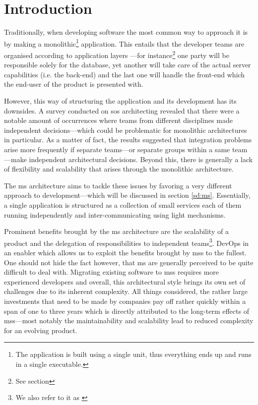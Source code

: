 \section{Introduction}%

Traditionally, when developing software the most common way to
approach it is by making a monolithic\footnote{The application is
built using a single unit, thus everything ends up and runs in a
single executable.} application.
\cite{ms-challenges} This entails that the developer teams are
organised according to application layers
\cite{ms-definition,ms-challenges}---for instance\footnote{See section
} one party will be responsible
solely for the database, yet another will take care of the actual
server capabilities (i.e. the back-end) and the last one will handle
the front-end which the end-user of the product is presented with.

However, this way of structuring the application and its development
has its downsides. A survey conducted on \gls{sos} architecting
\cite{sos-survey} revealed that there were a notable amount of
occurrences where teams from different disciplines made independent
decisions---which could be problematic for monolithic architectures in
particular. As a matter of fact, the results suggested that
integration problems arise more frequently if separate teams---or
separate groups within a same team---make
independent architectural decisions. \cite{sos-survey} Beyond this,
there is generally a lack of flexibility and scalability that arises
through the monolithic architecture. \cite{ms-challenges}

The \gls{ms} architecture aims to tackle these issues
\cite{ms-challenges} by favoring a very different approach to
development---which will be discussed in section \ref{sd:ms}.
Essentially, a single application is structured as a collection of small services
each of them running independently and inter-communicating using light
mechanisms.  \cite{ms-arch-study}

Prominent benefits brought by the \gls{ms} architecture are the
scalability of a product and the delegation of responsibilities to
independent teams\footnote{We also refer to it as
 \cite{ms-definition}}. \cite{ms-migration}
DevOps in an enabler which allows us to exploit
the benefits brought by \glspl{ms} to the fullest.
One should not hide the fact however,
that \gls{ms} are generally perceived to be quite difficult to deal
with. Migrating existing software to \glspl{ms} requires more
experienced developers and overall, this architectural style brings
its own set of challenges due to its inherent complexity.
\cite{ms-pains-gains} All things considered, the rather large
investments that need to be made by companies pay off rather quickly
within a span of one to three years which is directly attributed to
the long-term effects of \glspl{ms}---most notably the maintainability
and scalability lead to reduced complexity for an evolving product.
\cite{ms-migration}

